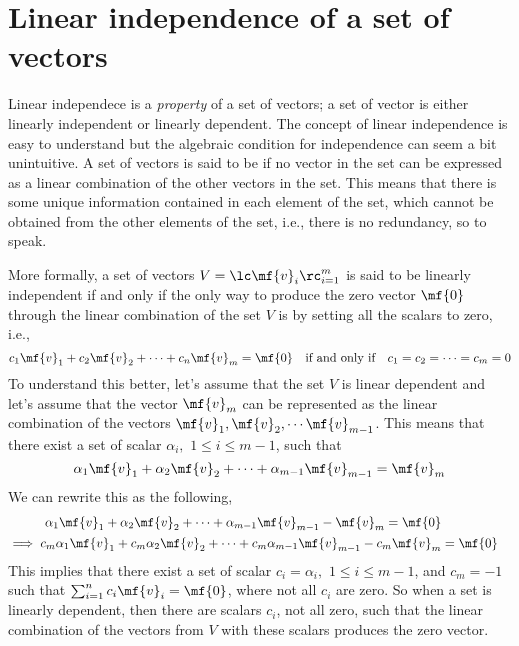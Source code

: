 \section{Linear independence of a set of vectors}
Linear independece is a \textit{property} of a set of vectors; a set of vector is either linearly independent or linearly dependent. The concept of linear independence is easy to understand but the algebraic condition for independence can seem a bit unintuitive. A set of vectors is said to be  if no vector in the set can be expressed as a linear combination of the other vectors in the set. This means that there is some unique  information contained in each element of the set, which cannot be obtained from the other elements of the set, i.e., there is no redundancy, so to speak. 

More formally, a set of vectors $V = \lc \mf{v}_i \rc_{i=1}^{m}$ is said to be linearly independent if and only if the only way to produce the zero vector $\mf{0}$ through the linear combination of the set $V$ is by setting all the scalars to zero, i.e.,
\begin{equation}
    c_1 \mf{v}_1 + c_2 \mf{v}_2 + \cdots + c_n \mf{v}_m = \mf{0} \quad \text{if and only if} \quad c_1 = c_2 = \cdots = c_m = 0
    \label{eq:linear-indep}
\end{equation}
To understand this better, let's assume that the set $V$ is linear dependent and let's assume that the vector $\mf{v}_m$ can be represented as the linear combination of the vectors $\mf{v}_1, \mf{v}_2, \cdots \mf{v}_{m-1}$. This means that there exist a set of scalar $\alpha_i, \,\, 1 \leq i \leq m-1$, such that
\[ \alpha_1 \mf{v}_1 + \alpha_2 \mf{v}_2 + \cdots + \alpha_{m-1}\mf{v}_{m-1} = \mf{v}_m \]
We can rewrite this as the following,
\[ \begin{split}
    \alpha_1 \mf{v}_1 + \alpha_2 \mf{v}_2 + \cdots + \alpha_{m-1}\mf{v}_{m-1} - \mf{v}_m = \mf{0} \\
    \implies c_m\alpha_1 \mf{v}_1 + c_m\alpha_2 \mf{v}_2 + \cdots + c_m\alpha_{m-1}\mf{v}_{m-1} - c_m\mf{v}_m &= \mf{0}
\end{split} \]
This implies that there exist a set of scalar $c_i = \alpha_i, \,\, 1 \leq i \leq m-1$, and $c_m = -1$ such that $\sum_{i=1}^nc_i \mf{v}_i = \mf{0}$, where not all $c_i$ are zero. So when a set is linearly dependent, then there are scalars $c_i$, not all zero, such that the linear combination of the vectors from $V$ with these scalars produces the zero vector.

